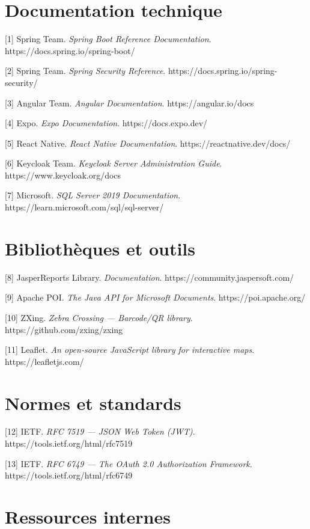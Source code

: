 \documentclass[12pt,a4paper]{report}
\begin{document}
\section*{Documentation technique}

[1] Spring Team. \textit{Spring Boot Reference Documentation}. https://docs.spring.io/spring-boot/

[2] Spring Team. \textit{Spring Security Reference}. https://docs.spring.io/spring-security/

[3] Angular Team. \textit{Angular Documentation}. https://angular.io/docs

[4] Expo. \textit{Expo Documentation}. https://docs.expo.dev/

[5] React Native. \textit{React Native Documentation}. https://reactnative.dev/docs/

[6] Keycloak Team. \textit{Keycloak Server Administration Guide}. https://www.keycloak.org/docs

[7] Microsoft. \textit{SQL Server 2019 Documentation}. https://learn.microsoft.com/sql/sql-server/

\section*{Bibliothèques et outils}

[8] JasperReports Library. \textit{Documentation}. https://community.jaspersoft.com/

[9] Apache POI. \textit{The Java API for Microsoft Documents}. https://poi.apache.org/

[10] ZXing. \textit{Zebra Crossing — Barcode/QR library}. https://github.com/zxing/zxing

[11] Leaflet. \textit{An open-source JavaScript library for interactive maps}. https://leafletjs.com/

\section*{Normes et standards}

[12] IETF. \textit{RFC 7519 — JSON Web Token (JWT)}. https://tools.ietf.org/html/rfc7519

[13] IETF. \textit{RFC 6749 — The OAuth 2.0 Authorization Framework}. https://tools.ietf.org/html/rfc6749

\section*{Ressources internes}
\end{document}
